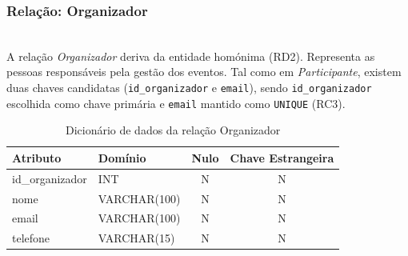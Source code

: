 \documentclass[runningheads]{llncs}
\begin{document}
                \vspace{0.3cm}
                \noindent\begin{minipage}{\textwidth}
                \subsubsection{Relação: Organizador}\mbox{}\\

                A relação \textit{Organizador} deriva da entidade homónima (RD2). Representa as
                pessoas responsáveis pela gestão dos eventos. Tal como em \textit{Participante},
                existem duas chaves candidatas (\texttt{id\_organizador} e \texttt{email}),
                sendo \texttt{id\_organizador} escolhida como chave primária e \texttt{email}
                mantido como \texttt{UNIQUE} (RC3).

                \begin{table}[H]
                \centering
                \renewcommand{\arraystretch}{1.4}
                \begin{tabular}{|l|l|c|c|}
                \hline
                \textbf{Atributo} & \textbf{Domínio} & \textbf{Nulo} & \textbf{Chave Estrangeira} \\ \hline
                id\_organizador & INT          & N & N \\ \hline
                nome            & VARCHAR(100) & N & N \\ \hline
                email           & VARCHAR(100) & N & N \\ \hline
                telefone        & VARCHAR(15)  & N & N \\ \hline
                \end{tabular}
                \vspace{0.2cm}
                \caption{Dicionário de dados da relação Organizador}
                \label{tab:dic_organizador}
                \end{table}
                \end{minipage}
\end{document}
